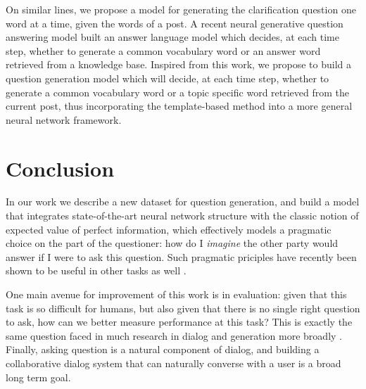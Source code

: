 \documentclass[11pt,a4paper]{article}
\begin{document}
On similar lines, we propose a model for generating the clarification question one word at a time, given the words of a post. A recent neural generative question answering model \cite{yin2016neural} built an answer language model which decides, at each time step, whether to generate a common vocabulary word or an answer word retrieved from a knowledge base. %
Inspired from this work, we propose to build a question generation model which will decide, at each time step, whether to generate a common vocabulary word or a topic specific word retrieved from the current post, thus incorporating the template-based method into a more general neural network framework.

\section{Conclusion}

In our work we describe a new dataset for question generation, and build a model that integrates state-of-the-art neural network structure with the classic notion of expected value of perfect information, which effectively models a pragmatic choice on the part of the questioner: how do I \emph{imagine} the other party would answer if I were to ask this question. Such pragmatic priciples have recently been shown to be useful in other tasks as well \cite{golland2010game,smith2013learning,orita2015discourse,andreas2016reasoning}.

One main avenue for improvement of this work is in evaluation: given that this task is so difficult for humans, but also given that there is no single right question to ask, how can we better measure performance at this task? This is exactly the same question faced in much research in dialog and generation more broadly \cite{paek2001empirical,lowe2015ubuntu,liu2016not,kannan2017adversarial}. Finally, asking question is a natural component of dialog, and building a collaborative dialog system that can naturally converse with a user is a broad long term goal.



\end{document}
